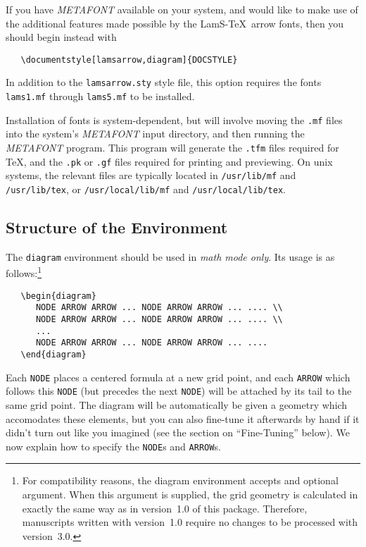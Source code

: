 If you have {\em METAFONT\/} available
on your system, and would like to make use of the additional
features made possible by the {\sc LamS}-\TeX\ arrow fonts,
then you should begin instead with
\begin{verbatim}
   \documentstyle[lamsarrow,diagram]{DOCSTYLE}
\end{verbatim}
In addition to the \verb"lamsarrow.sty" style file, this option
requires the fonts \verb"lams1.mf" through \verb"lams5.mf"
to be installed.

Installation of fonts is system-dependent,
but will involve moving the \verb".mf" files into the system's
{\em METAFONT\/} input directory, and then running the
{\em METAFONT\/} program.  This program will generate the
\verb".tfm" files required for \TeX, and the \verb".pk" or
\verb".gf" files required for printing and previewing.
On {\sc unix} systems, the relevant files are typically
located in \verb"/usr/lib/mf" and \verb"/usr/lib/tex", or 
\verb"/usr/local/lib/mf" and \verb"/usr/local/lib/tex".

\pagebreak[4]
\subsection{Structure of the Environment}

The \verb"diagram" environment should be used in
{\em math mode only}.  Its usage is as follows:\footnote{For
compatibility reasons, the diagram environment accepts and
optional argument.  When this argument is supplied, the grid
geometry is calculated in exactly the same way as in version~1.0
of this package. Therefore, manuscripts written with version~1.0
require no changes to be processed with version~3.0.}
\begin{verbatim}
   \begin{diagram}
      NODE ARROW ARROW ... NODE ARROW ARROW ... .... \\
      NODE ARROW ARROW ... NODE ARROW ARROW ... .... \\
      ...
      NODE ARROW ARROW ... NODE ARROW ARROW ... ....
   \end{diagram}
\end{verbatim}

Each \verb"NODE" places a centered formula at a new grid point, and
each \verb"ARROW" which follows this \verb"NODE" (but precedes the 
next \verb"NODE") will be attached by its tail to the same grid 
point. The diagram will be automatically be given a geometry which 
accomodates these elements, but you can also fine-tune it afterwards 
by hand if it didn't turn out like you imagined
(see the section on ``Fine-Tuning'' below).  We now explain
how to specify the \verb"NODE"s and \verb"ARROW"s.

